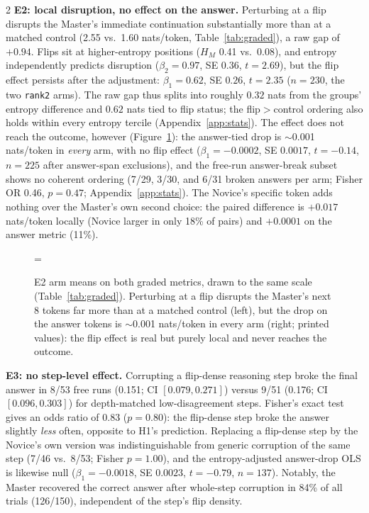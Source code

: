 \documentclass[9pt]{article}
\newcommand{\inputpgf}[1]{%
  \begingroup
  \def\mathdefault##1{##1}%
  \everymath=\expandafter{\the\everymath\displaystyle}%
  \fontsize{8}{9.6}\selectfont
  \endgroup
}
\begin{document}
\begin{multicols}{2}
\textbf{E2: local disruption, no effect on the answer.} Perturbing at a flip disrupts
the Master's immediate continuation substantially more than at a matched
control (2.55 vs.\ 1.60 nats/token, Table~\ref{tab:graded}), a raw gap of
$+0.94$. Flips sit at higher-entropy positions ($H_M$ 0.41 vs.\ 0.08), and
entropy independently predicts disruption ($\beta_2 = 0.97$, SE $0.36$,
$t = 2.69$), but the flip effect persists after the adjustment: $\beta_1 = 0.62$,
SE $0.26$, $t = 2.35$ ($n{=}230$, the two \texttt{rank2} arms). The raw gap
thus splits into roughly $0.32$ nats from the groups' entropy difference and
$0.62$ nats tied to flip status; the flip$>$control ordering also holds
within every entropy tercile (Appendix~\ref{app:stats}). The effect does not
reach the outcome, however (Figure~\ref{fig:e2-dissociation}): the answer-tied drop is $\sim$0.001 nats/token
in \emph{every} arm, with no flip effect ($\beta_1 = -0.0002$, SE $0.0017$,
$t = -0.14$, $n{=}225$ after answer-span exclusions), and the free-run
answer-break subset shows no coherent ordering (7/29, 3/30, and 6/31 broken
answers per arm; Fisher OR 0.46, $p = 0.47$; Appendix~\ref{app:stats}). The
Novice's specific token adds nothing over the Master's own second choice:
the paired difference is $+0.017$ nats/token locally (Novice larger in only
18\% of pairs) and $+0.0001$ on the answer metric (11\%).

\begin{figure}[H]
  \centering
  \inputpgf{figures/e2_dissociation.pgf}
  \caption{E2 arm means on both graded metrics, drawn to the same scale
    (Table~\ref{tab:graded}). Perturbing at a flip disrupts the Master's
    next 8 tokens far more than at a matched control (left), but the drop
    on the answer tokens is $\sim$0.001 nats/token in every arm (right;
    printed values): the flip effect is real but purely local and never
    reaches the outcome.}
  \label{fig:e2-dissociation}
\end{figure}

\textbf{E3: no step-level effect.} Corrupting a flip-dense reasoning step broke
the final answer in 8/53 free runs (0.151; CI $[0.079, 0.271]$) versus 9/51
(0.176; CI $[0.096, 0.303]$) for depth-matched low-disagreement steps.
Fisher's exact test gives an odds ratio of 0.83 ($p = 0.80$): the flip-dense
step broke the answer slightly \emph{less} often, opposite to H1's
prediction. Replacing a flip-dense step by the Novice's own version was
indistinguishable from generic corruption of the same step (7/46 vs.\ 8/53;
Fisher $p = 1.00$), and the entropy-adjusted answer-drop OLS is likewise
null ($\beta_1 = -0.0018$, SE $0.0023$, $t = -0.79$, $n{=}137$). Notably,
the Master recovered the correct answer after whole-step corruption in 84\%
of all trials (126/150), independent of the step's flip density.


\end{multicols}
\end{document}
